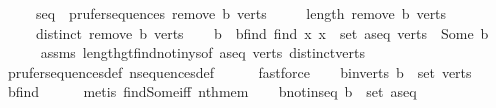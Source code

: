 \begin{isabellebody}
\ \ \ \ \ {\isachardoublequoteopen}seq\ {\isasymin}\ prufer{\isacharunderscore}{\kern0pt}sequences\ {\isacharparenleft}{\kern0pt}remove{}\ b\ verts{\isacharparenright}{\kern0pt}{\isachardoublequoteclose}\isanewline
\ \ \ \ \ {\isachardoublequoteopen}length\ {\isacharparenleft}{\kern0pt}remove{}\ b\ verts{\isacharparenright}{\kern0pt}\ {\isasymge}\ {}{\isachardoublequoteclose}\isanewline
\ \ \ \ \ {\isachardoublequoteopen}distinct\ {\isacharparenleft}{\kern0pt}remove{}\ b\ verts{\isacharparenright}{\kern0pt}{\isachardoublequoteclose}\isanewline
%
\isadelimproof
%
\endisadelimproof
%
\isatagproof
{}\isamarkupfalse%
{\isacharminus}{\kern0pt}\isanewline
\ \ \isamarkupfalse%
\ b\ \ b{\isacharunderscore}{\kern0pt}find{\isacharcolon}{\kern0pt}\ {\isachardoublequoteopen}find\ {\isacharparenleft}{\kern0pt}{\isasymlambda}x{\isachardot}{\kern0pt}\ x\ {\isasymnotin}\ set\ {\isacharparenleft}{\kern0pt}a{\isacharhash}{\kern0pt}seq{\isacharparenright}{\kern0pt}{\isacharparenright}{\kern0pt}\ verts\ {\isacharequal}{\kern0pt}\ Some\ b{\isachardoublequoteclose}\isanewline
\ \ \ \ \isamarkupfalse%
\ assms\ length{\isacharunderscore}{\kern0pt}gt{\isacharunderscore}{\kern0pt}find{\isacharunderscore}{\kern0pt}not{\isacharunderscore}{\kern0pt}in{\isacharunderscore}{\kern0pt}ys{\isacharbrackleft}{\kern0pt}of\ {\isachardoublequoteopen}a{\isacharhash}{\kern0pt}seq{\isachardoublequoteclose}\ verts{\isacharbrackright}{\kern0pt}\ distinct{\isacharunderscore}{\kern0pt}verts\isanewline
\ \ \ \ \isamarkupfalse%
\ prufer{\isacharunderscore}{\kern0pt}sequences{\isacharunderscore}{\kern0pt}def\ n{\isacharunderscore}{\kern0pt}sequences{\isacharunderscore}{\kern0pt}def\isanewline
\ \ \ \ \isamarkupfalse%
\ fastforce\isanewline
\ \ \isamarkupfalse%
\ b{\isacharunderscore}{\kern0pt}in{\isacharunderscore}{\kern0pt}verts{\isacharcolon}{\kern0pt}\ {\isachardoublequoteopen}b\ {\isasymin}\ set\ verts{\isachardoublequoteclose}\ \isamarkupfalse%
\ b{\isacharunderscore}{\kern0pt}find\isanewline
\ \ \ \ \isamarkupfalse%
\ {\isacharparenleft}{\kern0pt}metis\ find{\isacharunderscore}{\kern0pt}Some{\isacharunderscore}{\kern0pt}iff\ nth{\isacharunderscore}{\kern0pt}mem{\isacharparenright}{\kern0pt}\isanewline
\ \ \isamarkupfalse%
\ b{\isacharunderscore}{\kern0pt}not{\isacharunderscore}{\kern0pt}in{\isacharunderscore}{\kern0pt}seq{\isacharcolon}{\kern0pt}\ {\isachardoublequoteopen}b\ {\isasymnotin}\ set\ {\isacharparenleft}{\kern0pt}a{\isacharhash}{\kern0pt}seq{\isacharparenright}{\kern0pt}{\isachardoublequoteclose}\ \isamarkupfalse%

\end{isabellebody}
